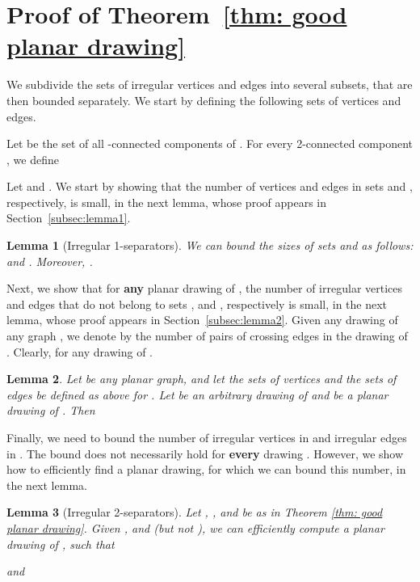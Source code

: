 \documentclass[twoside,leqno,twocolumn]{article}
\newtheorem{lemma}{Lemma}
\begin{document}
\fi



\section{Proof of Theorem~\ref{thm: good planar drawing}}\label{sec:finding a planar drawing}




We subdivide the sets of irregular vertices and edges into several subsets, that are then bounded separately. 
We start by defining the following sets of vertices and edges.

Let  be the set of all -connected components of .
For every 2-connected component , we define
\ifabstract

\fi
\iffull

\fi
Let  and . 
We start by showing that the number of vertices and edges in sets  and , respectively, is small, in the next lemma, whose proof appears in Section~\ref{subsec:lemma1}.

\begin{lemma}[Irregular 1-separators]\label{lem:irregular1} We can bound the sizes of sets   and  as follows:
 and .
Moreover, .
\end{lemma}

Next, we show that for {\bf any} planar drawing  of , the number of irregular vertices and edges that do not belong to sets , and , respectively is small, in the next lemma, whose proof appears in Section~\ref{subsec:lemma2}.
Given any drawing  of any graph ,
we denote by  the number of pairs of crossing edges in the drawing  of . Clearly,  for any drawing  of .


\begin{lemma}\label{lem:irregular3}
Let  be any planar graph, and let the sets  of vertices and the sets  of edges be defined as above for . Let  be an arbitrary drawing of  and  be a planar drawing of .
Then
\ifabstract

\fi\iffull

\fi
\end{lemma}
Finally, we need to bound the number of irregular vertices in  and irregular edges in . The bound does  not necessarily hold for {\bf every} drawing . However, we show how to efficiently find a planar drawing, for which we can bound this number, in the next lemma.


\begin{lemma}[Irregular 2-separators]\label{lem:irregular2}
Let , ,  and  be as in Theorem \ref{thm: good planar drawing}.
Given ,  and  (but not ), 
we can efficiently compute a planar drawing  of , such that

and

\end{lemma}
\end{document}
